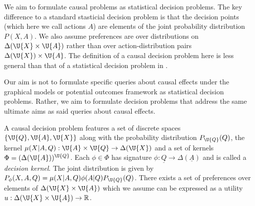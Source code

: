 




We aim to formulate causal problems as statistical decision problems. The key difference to a standard stasticial decision problem is that the decision points (which here we call actions $A$) are elements of the joint probability distribution $P(X,A)$. We also assume preferences are over distributions on $\Delta(\U{X}\times\U{A})$ rather than over action-distribution pairs $\Delta(\U{X})\times\U{A}$. The definition of a causal decision problem here is less general than that of a statistical decision problem in \cite{wald1950statistical}.

Our aim is not to formulate specific queries about causal effects under the graphical models or potential outcomes framework as statistical decision problems. Rather, we aim to formulate decision problems that address the same ultimate aims as said queries about causal effects.

A causal decision problem features a set of discrete spaces $\{\U{Q},\U{A},\U{X}\}$ along with the probability distribution $P_{\U{Q}}(Q)$, the kernel $\mu(X|A,Q):\U{A}\times\U{Q}
\to \Delta(\U{X})$ and a set of kernels $\Phi= (\Delta(\U{A}))^{\U{Q}}$. Each $\phi\in\Phi$ has signature $\phi:\underline{Q}\to \Delta(\underline{A})$ and is called a \emph{decision kernel}. The joint distribution is given by $P_{\phi}(X,A,Q) = \mu(X|A,Q)\phi(A|Q)P_{\U{Q}}(Q)$. There exists a set of preferences over elements of $\Delta(\U{X}\times \U{A})$ which we assume can be expressed as a utility $u:\Delta(\U{X}\times \U{A})\to \mathbb{R}$. 

